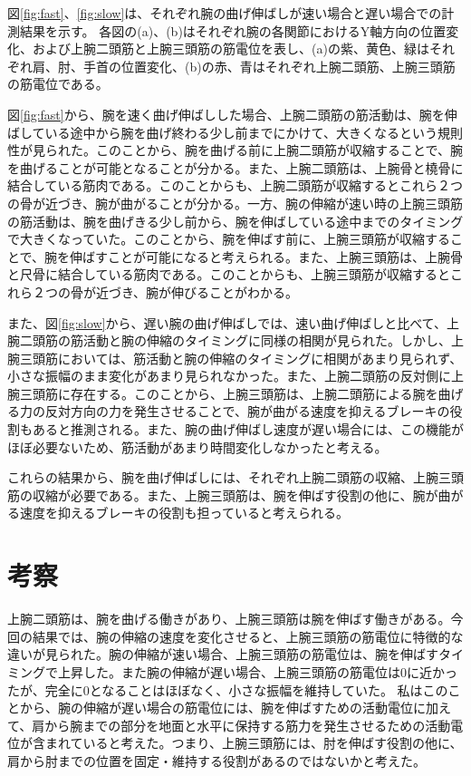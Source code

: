 \documentclass{jsarticle}
\begin{document}
図\ref{fig:fast}、\ref{fig:slow}は、それぞれ腕の曲げ伸ばしが速い場合と遅い場合での計測結果を示す。
各図の(a)、(b)はそれぞれ腕の各関節におけるY軸方向の位置変化、および上腕二頭筋と上腕三頭筋の筋電位を表し、(a)の紫、黄色、緑はそれぞれ肩、肘、手首の位置変化、(b)の赤、青はそれぞれ上腕二頭筋、上腕三頭筋の筋電位である。

図\ref{fig:fast}から、腕を速く曲げ伸ばしした場合、上腕二頭筋の筋活動は、腕を伸ばしている途中から腕を曲げ終わる少し前までにかけて、大きくなるという規則性が見られた。このことから、腕を曲げる前に上腕二頭筋が収縮することで、腕を曲げることが可能となることが分かる。また、上腕二頭筋は、上腕骨と橈骨に結合している筋肉である。このことからも、上腕二頭筋が収縮するとこれら２つの骨が近づき、腕が曲がることが分かる。一方、腕の伸縮が速い時の上腕三頭筋の筋活動は、腕を曲げきる少し前から、腕を伸ばしている途中までのタイミングで大きくなっていた。このことから、腕を伸ばす前に、上腕三頭筋が収縮することで、腕を伸ばすことが可能になると考えられる。また、上腕三頭筋は、上腕骨と尺骨に結合している筋肉である。このことからも、上腕三頭筋が収縮するとこれら２つの骨が近づき、腕が伸びることがわかる。

また、図\ref{fig:slow}から、遅い腕の曲げ伸ばしでは、速い曲げ伸ばしと比べて、上腕二頭筋の筋活動と腕の伸縮のタイミングに同様の相関が見られた。しかし、上腕三頭筋においては、筋活動と腕の伸縮のタイミングに相関があまり見られず、小さな振幅のまま変化があまり見られなかった。また、上腕二頭筋の反対側に上腕三頭筋に存在する。このことから、上腕三頭筋は、上腕二頭筋による腕を曲げる力の反対方向の力を発生させることで、腕が曲がる速度を抑えるブレーキの役割もあると推測される。また、腕の曲げ伸ばし速度が遅い場合には、この機能がほぼ必要ないため、筋活動があまり時間変化しなかったと考える。　

これらの結果から、腕を曲げ伸ばしには、それぞれ上腕二頭筋の収縮、上腕三頭筋の収縮が必要である。また、上腕三頭筋は、腕を伸ばす役割の他に、腕が曲がる速度を抑えるブレーキの役割も担っていると考えられる。

\section{考察}

上腕二頭筋は、腕を曲げる働きがあり、上腕三頭筋は腕を伸ばす働きがある\cite{reference1}。今回の結果では、腕の伸縮の速度を変化させると、上腕三頭筋の筋電位に特徴的な違いが見られた。腕の伸縮が速い場合、上腕三頭筋の筋電位は、腕を伸ばすタイミングで上昇した。また腕の伸縮が遅い場合、上腕三頭筋の筋電位は0に近かったが、完全に0となることはほぼなく、小さな振幅を維持していた。
私はこのことから、腕の伸縮が遅い場合の筋電位には、腕を伸ばすための活動電位に加えて、肩から腕までの部分を地面と水平に保持する筋力を発生させるための活動電位が含まれていると考えた。つまり、上腕三頭筋には、肘を伸ばす役割の他に、肩から肘までの位置を固定・維持する役割があるのではないかと考えた。
\end{document}
